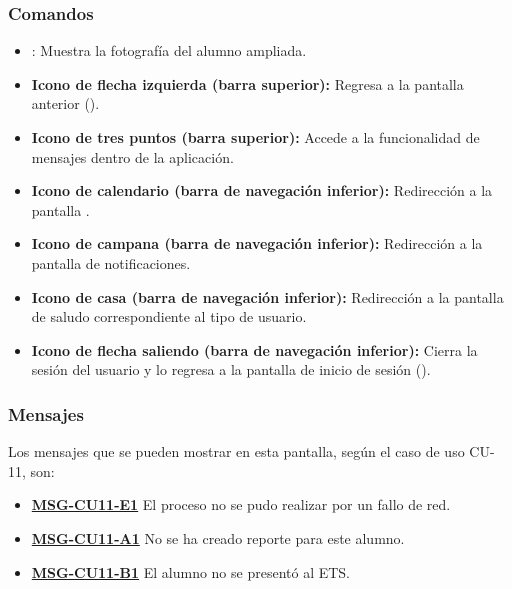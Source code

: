 \subsubsection{Comandos}
\begin{itemize}
	\item {}: Muestra la fotografía del alumno ampliada.
	\item \textbf{Icono de flecha izquierda (barra superior):} Regresa a la pantalla anterior ().
	\item \textbf{Icono de tres puntos (barra superior):} Accede a la funcionalidad de mensajes dentro de la aplicación.
	\item \textbf{Icono de calendario (barra de navegación inferior):} Redirección a la pantalla .
	\item \textbf{Icono de campana (barra de navegación inferior):} Redirección a la pantalla de notificaciones.
	\item \textbf{Icono de casa (barra de navegación inferior):} Redirección a la pantalla de saludo correspondiente al tipo de usuario.
	\item \textbf{Icono de flecha saliendo (barra de navegación inferior):} Cierra la sesión del usuario y lo regresa a la pantalla de inicio de sesión ().
\end{itemize}

\subsubsection{Mensajes}
Los mensajes que se pueden mostrar en esta pantalla, según el caso de uso CU-11, son:
\begin{itemize}
	\item \textbf{\hyperref[msg:CU11-E1]{MSG-CU11-E1}} El proceso no se pudo realizar por un fallo de red.
	\item \textbf{\hyperref[msg:CU11-A1]{MSG-CU11-A1}} No se ha creado reporte para este alumno.
	\item \textbf{\hyperref[msg:CU11-B1]{MSG-CU11-B1}} El alumno no se presentó al ETS.
\end{itemize}
